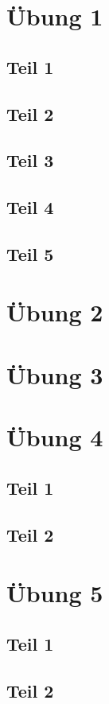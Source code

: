 \documentclass[10pt,a4paper]{article}
\begin{document}
\section{Übung 1}

\subsection{Teil 1}

\subsection{Teil 2}

\subsection{Teil 3}

\subsection{Teil 4}

\subsection{Teil 5}

\section{Übung 2}

\section{Übung 3}

\section{Übung 4}

\subsection{Teil 1}

\subsection{Teil 2}

\section{Übung 5}

\subsection{Teil 1}

\subsection{Teil 2}
\end{document}
